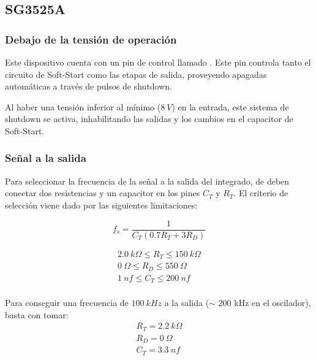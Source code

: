 %
%
%

\subsection{SG3525A}

\subsubsection{Debajo de la tensión de operación}

Este dispositivo cuenta con un pin de control llamado . Este pin controla tanto el circuito de Soft-Start como las etapas de salida, proveyendo apagadas automáticas a través de pulsos de shutdown.

Al haber una tensión inferior al mínimo ($8 \ V$) en la entrada, este sistema de shutdown se activa, inhabilitando las salidas y los cambios en el capacitor de Soft-Start.

\subsubsection{Señal a la salida}

Para seleccionar la frecuencia de la señal a la salida del integrado, de deben conectar dos resistencias y un capacitor en los pines $C_T$ y $R_T$. El criterio de selección viene dado por las siguientes limitaciones:

\begin{equation}
	f_s = \frac{1}{C_T \left( 0.7 R_T + 3 R_D \right)}
\end{equation}

\begin{equation*}
\begin{gathered}
2.0 \ k\Omega \leqslant R_T \leqslant 150 \ k\Omega \\
0 \ \Omega \leqslant R_D \leqslant 550 \ \Omega \\
1 \ nf \leqslant C_T \leqslant 200 \ nf \\
\end{gathered}
\end{equation*}

Para conseguir una frecuencia de $100 \ kHz$ a la salida ($\sim$ 200 kHz en el oscilador), basta con tomar:
\begin{equation}
\begin{gathered}
R_T = 2.2 \ k\Omega \\
R_D = 0 \ \Omega \\
C_T = 3.3 \ nf \\
\end{gathered}
\end{equation}


